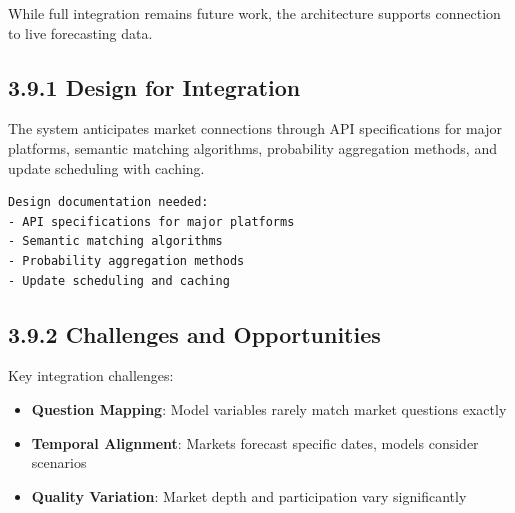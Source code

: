 \documentclass[
  11pt,
  letterpaper,
]{book}
\providecommand{\tightlist}{%
  \setlength{\itemsep}{0pt}\setlength{\parskip}{0pt}}
\begin{document}

While full integration remains future work, the architecture supports
connection to live forecasting data.

\subsection*{3.9.1 Design for Integration}\label{sec-integration-design}

\begin{tcolorbox}[enhanced jigsaw, opacitybacktitle=0.6, colbacktitle=quarto-callout-note-color!10!white, toptitle=1mm, colback=white, breakable, left=2mm, bottomrule=.15mm, title=\textcolor{quarto-callout-note-color}{\faInfo}\hspace{0.5em}{Integration Architecture}, rightrule=.15mm, arc=.35mm, toprule=.15mm, opacityback=0, colframe=quarto-callout-note-color-frame, bottomtitle=1mm, titlerule=0mm, leftrule=.75mm, coltitle=black]

The system anticipates market connections through API specifications for
major platforms, semantic matching algorithms, probability aggregation
methods, and update scheduling with caching.

\end{tcolorbox}

\begin{verbatim}
Design documentation needed:
- API specifications for major platforms
- Semantic matching algorithms
- Probability aggregation methods
- Update scheduling and caching
\end{verbatim}

\subsection*{3.9.2 Challenges and
Opportunities}\label{sec-market-challenges}

Key integration challenges:

\begin{itemize}
\tightlist
\item
  \textbf{Question Mapping}: Model variables rarely match market
  questions exactly
\item
  \textbf{Temporal Alignment}: Markets forecast specific dates, models
  consider scenarios
\item
  \textbf{Quality Variation}: Market depth and participation vary
  significantly
\end{itemize}
\end{document}
